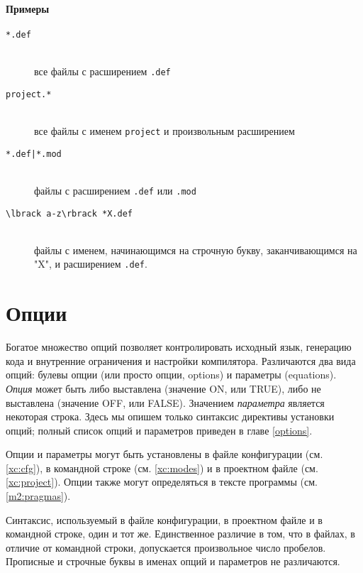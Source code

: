 \paragraph{Примеры}
\begin{description}

\item[\verb|*.def|] \mbox{} \\
    все файлы с расширением {\tt .def}

\item[\verb|project.*|] \mbox{} \\
    все файлы с именем {\tt project} и произвольным расширением

\item[\verb+*.def|*.mod+] \mbox{} \\
    файлы с расширением {\tt .def} или {\tt .mod}

\item[\verb'\lbrack a-z\rbrack *X.def'] \mbox{} \\ %
    файлы с именем, начинающимся на строчную букву,
    заканчивающимся на "X", и расширением \verb|.def|.
\end{description}

\section{Опции}\label{config:options}

Богатое множество опций \xds{} позволяет контролировать исходный язык, 
генерацию кода и внутренние ограничения и настройки компилятора.
Различаются два вида опций: булевы опции (или просто опции, options) 
и параметры (equations).
{\em Опция} может быть либо выставлена (значение ON, или TRUE), 
либо не выставлена (значение OFF, или FALSE). 
Значением {\em параметра} является некоторая строка.
Здесь мы опишем только синтаксис директивы установки опций; полный список
опций и параметров \xds{} приведен в главе \ref{options}.

Опции и параметры могут быть установлены в файле конфигурации (см.
\ref{xc:cfg}), в командной строке (см. \ref{xc:modes}) и в проектном файле
(см. \ref{xc:project}). Опции также могут определяться в тексте программы
(см. \ref{m2:pragmas}).

Синтаксис, используемый в файле конфигурации, в проектном файле и в 
командной строке, один и тот же. Единственное различие в том, что в 
файлах, в отличие от командной строки, допускается произвольное 
число пробелов. Прописные и строчные буквы в именах опций и параметров 
не различаются.

